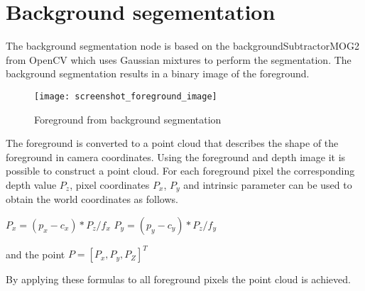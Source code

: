 \section*{Background segementation}

The background segmentation node is based on the backgroundSubtractorMOG2 from OpenCV \cite{BGS} which uses Gaussian mixtures to perform the segmentation. The background segmentation results in a binary image of the foreground. 

\begin{figure}[H]
\begin{center}
\texttt{[image: screenshot\_foreground\_image]}
\caption{Foreground from background segmentation}

\end{center}
\end{figure}

The foreground is converted to a point cloud that describes the shape of the foreground in camera coordinates. Using the foreground and depth image it is possible to construct a point cloud. For each foreground pixel the corresponding depth value $P_z$, pixel coordinates $P_x$, $P_y$ and intrinsic parameter can be used to obtain the world coordinates as follows.

$P_x = (p_x - c_x) * P_z / f_x$
$P_y = (p_y - c_y) * P_z / f_y$

and the point $P = [P_x, P_y, P_Z]^T$

By applying these formulas to all foreground pixels the point cloud is achieved.


